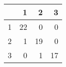 \begin{tabular}{rrrr}
  \hline
 & 1 & 2 & 3 \\ 
  \hline
1 &  22 &   0 &   0 \\ 
  2 &   1 &  19 &   0 \\ 
  3 &   0 &   1 &  17 \\ 
   \hline
\end{tabular}
